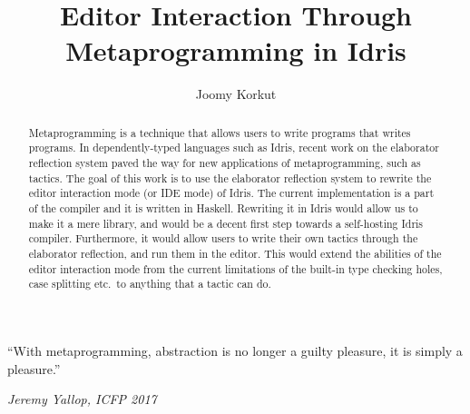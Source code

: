 \documentclass[11pt, ma]{westhesis}
\title{Editor Interaction Through Metaprogramming in Idris}
\author{Joomy Korkut}
\theoremstyle{plain}
\theoremstyle{definition}
\begin{document}
\begin{abstract}
Metaprogramming is a technique that allows users to write programs that writes
programs. In dependently-typed languages such as Idris, recent work on the
elaborator reflection system paved the way for new applications of
metaprogramming, such as tactics. The goal of this work is to use the
elaborator reflection system to rewrite the editor interaction mode (or IDE
mode) of Idris. The current implementation is a part of the compiler and it
is written in Haskell. Rewriting it in Idris would allow us to make it a mere
library, and would be a decent first step towards a self-hosting Idris compiler.
Furthermore, it would allow users to write their own tactics through the
elaborator reflection, and run them in the editor. This would extend the
abilities of the editor interaction mode from the current limitations of the
built-in type checking holes, case splitting etc.\ to anything that a tactic
can do.
\end{abstract}

\begin{dedication}
\epigraph{``With metaprogramming, abstraction is no longer a guilty pleasure,
  it is simply a pleasure.''}{\textit{Jeremy Yallop, ICFP 2017}}
\end{dedication}

\begin{acknowledgements}
\end{acknowledgements}

\frontmatter
\maketitle
\makeabstract

\tableofcontents

\mainmatter

% 


\end{document}

